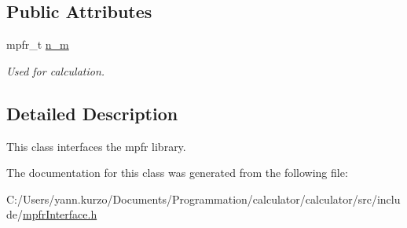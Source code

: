 \subsection*{Public Attributes}
\begin{DoxyCompactItemize}
\item 
\hypertarget{class_mpfr_aca93d8e3e1819bf5edae49b788aa265d}{}mpfr\+\_\+t \hyperlink{class_mpfr_aca93d8e3e1819bf5edae49b788aa265d}{n\+\_\+m}\label{class_mpfr_aca93d8e3e1819bf5edae49b788aa265d}

\begin{DoxyCompactList}\small\item\em Used for calculation. \end{DoxyCompactList}\end{DoxyCompactItemize}


\subsection{Detailed Description}
This class interfaces the mpfr library. 

The documentation for this class was generated from the following file\+:\begin{DoxyCompactItemize}
\item 
C\+:/\+Users/yann.\+kurzo/\+Documents/\+Programmation/calculator/calculator/src/include/\hyperlink{mpfr_interface_8h}{mpfr\+Interface.\+h}\end{DoxyCompactItemize}
